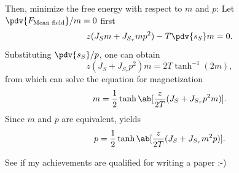 \begin{solution}
\begin{enumext}[label = \Roman*.]
\begin{enumext}[label = (\alph*)]
\[      \]
      Then, minimize the free energy with respect to $m$ and $p$: Let
      $\pdv{F_\text{Mean field}}/m = 0$ first
      \[
        z(J_S m + J_{S_\tau}mp^2) - T\pdv{s_S}m = 0.
      \]
      Substituting $\pdv{s_S}/p$, one can obtain
      \[
        z(J_S + J_{S_\tau}p^2)m = 2T\tanh^{-1}(2m),
      \]
      from which can solve the equation for magnetization
      \[
        m = \frac12\tanh\ab[\frac{z}{2T}(J_S + J_{S_\tau}p^2m)].
      \]
      Since $m$ and $p$ are equivalent, yields
      \[
        p = \frac12\tanh\ab[\frac{z}{2T}(J_S + J_{S_\tau}m^2p)].
      \]
      \item See if my achievements are qualified for writing a
      paper \textsf{:-)}
    \end{enumext}
  \end{enumext}
\end{solution}
\newpage
\begingroup
{}
